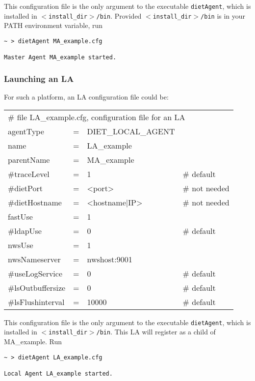 This configuration file is the only argument to the executable
\texttt{dietAgent}, which is installed in
\texttt{$<$install\_dir$>$/bin}. Provided
\texttt{$<$install\_dir$>$/bin} is in your PATH environment variable, run
{\footnotesize
\begin{verbatim}
~ > dietAgent MA_example.cfg

Master Agent MA_example started.
\end{verbatim}
}


\subsubsection{Launching an LA}

For such a platform, an LA configuration file could be:
\tt
\begin{center}
 \footnotesize
 \begin{tabular}{lcll}
  \multicolumn{4}{l}{\# file LA\_example.cfg, configuration file for an LA}\\
  agentType    &=&DIET\_LOCAL\_AGENT&\\
  name         &=&LA\_example       &\\
  parentName   &=&MA\_example       &\\
  \#traceLevel &=&1                 &\# default\\
  \#dietPort    &=&<port>             &\# not needed\\
  \#dietHostname&=&<hostname|IP>      &\# not needed\\
  fastUse    &=&1                 &\\
  \#ldapUse    &=&0                 &\# default\\
  nwsUse     &=&1                 &\\
  nwsNameserver&=&nwshost:9001      &\\
  \#useLogService &=& 0               &\# default\\
  \#lsOutbuffersize &=& 0             &\# default\\
  \#lsFlushinterval &=& 10000           &\# default\\
 \end{tabular}
\end{center}
\rm

This configuration file is the only argument to the executable
\texttt{dietAgent}, which is installed in
\texttt{$<$install\_dir$>$/bin}. This LA will register as a child of
MA\_example. Run {\footnotesize
\begin{verbatim}
~ > dietAgent LA_example.cfg

Local Agent LA_example started.

\end{verbatim}
}

